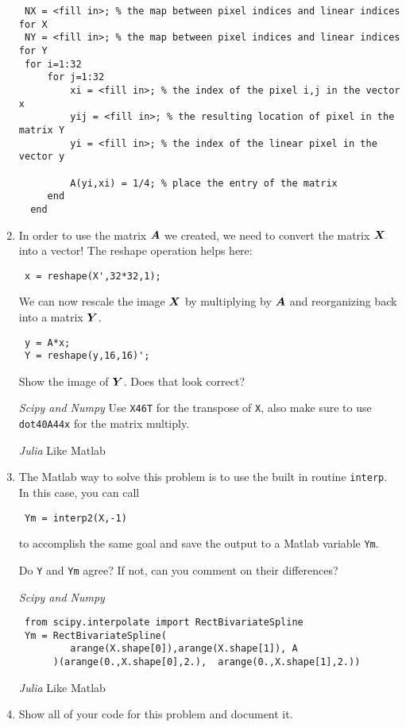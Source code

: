 \documentclass{article}
\begin{document}
\begin{enumerate}
\begin{verbatim} NX = <fill in>; % the map between pixel indices and linear indices for X
 NY = <fill in>; % the map between pixel indices and linear indices for Y
 for i=1:32
     for j=1:32    
         xi = <fill in>; % the index of the pixel i,j in the vector x
         yij = <fill in>; % the resulting location of pixel in the matrix Y
         yi = <fill in>; % the index of the linear pixel in the vector y
         
         A(yi,xi) = 1/4; % place the entry of the matrix
     end
  end\end{verbatim}

\item In order to use the matrix $\boldsymbol{A}$ we created, we need to convert the matrix $\boldsymbol{X}$ into a vector! The reshape operation helps here:

\begin{verbatim} x = reshape(X',32*32,1);\end{verbatim}
We can now rescale the image $\boldsymbol{X}$ by multiplying by $\boldsymbol{A}$ and reorganizing back into a matrix $\boldsymbol{Y}$.

\begin{verbatim} y = A*x;
 Y = reshape(y,16,16)';\end{verbatim}
Show the image of $\boldsymbol{Y}$. Does that look correct?

\emph{Scipy and Numpy} Use {\colorbox[rgb]{1.00,0.93,1.00}{\tt X\char46T}} for the transpose of {\colorbox[rgb]{1.00,0.93,1.00}{\tt X}}, also make sure to use {\colorbox[rgb]{1.00,0.93,1.00}{\tt dot\char40A\char44x}} for the matrix multiply.

\emph{Julia} Like Matlab


\item The Matlab way to solve this problem is to use the built in routine {\colorbox[rgb]{1.00,0.93,1.00}{\tt interp}}. In this case, you can call

\begin{verbatim} Ym = interp2(X,-1)\end{verbatim}
to accomplish the same goal and save the output to a Matlab variable {\colorbox[rgb]{1.00,0.93,1.00}{\tt Ym}}.

Do {\colorbox[rgb]{1.00,0.93,1.00}{\tt Y}} and {\colorbox[rgb]{1.00,0.93,1.00}{\tt Ym}} agree? If not, can you comment on their differences?

\emph{Scipy and Numpy}

\begin{verbatim} from scipy.interpolate import RectBivariateSpline
 Ym = RectBivariateSpline(
         arange(X.shape[0]),arange(X.shape[1]), A
      )(arange(0.,X.shape[0],2.),  arange(0.,X.shape[1],2.))\end{verbatim}
\emph{Julia} Like Matlab


\item Show all of your code for this problem and document it.



\end{enumerate}
\end{document}
